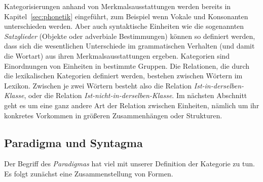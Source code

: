 

Kategorisierungen anhand von Merkmalsausstattungen werden bereits in Kapitel~\ref{sec:phonetik} eingeführt, zum Beispiel wenn Vokale und Konsonanten unterschieden werden.
Aber auch syntaktische Einheiten wie die sogenannten \textit{Satzglieder} (\zB Objekte oder adverbiale Bestimmungen) können so definiert werden, dass sich die wesentlichen Unterschiede im grammatischen Verhalten (und damit die Wortart) aus ihren Merkmalsausstattungen ergeben.
Kategorien sind Einordnungen von Einheiten in bestimmte Gruppen.
Die Relationen, die durch die lexikalischen Kategorien definiert werden, bestehen zwischen Wörtern im Lexikon.
Zwischen je zwei Wörtern besteht also die Relation \textit{Ist-in-derselben-Klasse}, oder die Relation \textit{Ist-nicht-in-derselben-Klasse}.
Im nächsten Abschnitt geht es um eine ganz andere Art der Relation zwischen Einheiten, nämlich um ihr konkretes Vorkommen in größeren Zusammenhängen oder Strukturen.

\subsection{Paradigma und Syntagma}
\label{sec:paradigmaundsyntagma}

Der Begriff des \textit{Paradigmas} hat viel mit unserer Definition der Kategorie zu tun.
Es folgt zunächst eine Zusammenstellung von Formen.

\begin{exe}
  \ex\label{ex:paradigmaundsyntagma004}
  \begin{xlist}
  \end{xlist}
  \ex\label{ex:paradigmaundsyntagma005}
  \begin{xlist}
  \end{xlist}
  \ex\label{ex:paradigmaundsyntagma006}
  \begin{xlist}
  \end{xlist}
  \ex\label{ex:paradigmaundsyntagma007}
  \begin{xlist}
  \end{xlist}
  \ex\label{ex:paradigmaundsyntagma008}
  \begin{xlist}
  \end{xlist}
\end{exe}

